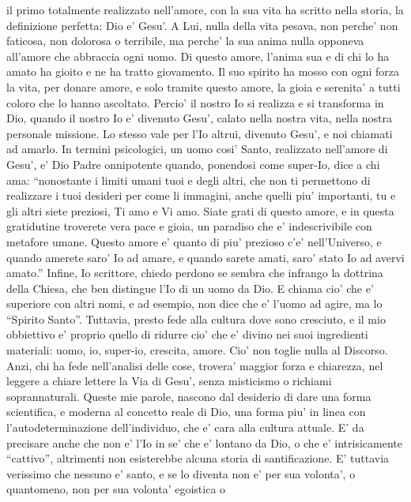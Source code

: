 il primo totalmente realizzato nell'amore,
con la sua vita ha scritto nella storia,
la definizione perfetta:
\hspace{1cm} Dio e' Gesu'.
A Lui, nulla della vita pesava,
non perche' non faticosa, non dolorosa o terribile,
ma perche' la sua anima nulla opponeva
all'amore che abbraccia ogni uomo.
Di questo amore, l'anima sua e di chi lo ha amato
ha gioito e ne ha tratto giovamento.
Il suo spirito ha mosso con ogni forza la vita,
per donare amore, e solo tramite questo amore,
la gioia e serenita' a tutti coloro
che lo hanno ascoltato.
Percio' il nostro Io si realizza e si transforma in Dio, 
quando il nostro Io e' divenuto Gesu',
calato nella nostra vita,
nella nostra personale missione.
Lo stesso vale per l'Io altrui, divenuto Gesu',
e noi chiamati ad amarlo.
\leavevmode
In termini psicologici, un uomo cosi' Santo,
realizzato nell'amore di Gesu', e' Dio Padre onnipotente
quando, ponendosi come super-Io, dice a chi ama:
``nonostante i limiti umani tuoi e degli altri,
che non ti permettono di realizzare i tuoi desideri
per come li immagini, anche quelli piu' importanti,
tu e gli altri siete preziosi,
Ti amo e Vi amo.
Siate grati di questo amore,
e in questa gratidutine
troverete vera pace e gioia,
un paradiso che e' indescrivibile con metafore umane.
Questo amore e' quanto di piu' prezioso 
c'e' nell'Universo,
e quando amerete saro' Io ad amare,
e quando sarete amati, saro' stato Io ad avervi amato.''
\leavevmode
Infine, Io scrittore, chiedo perdono 
se sembra che infrango la dottrina della Chiesa,
che ben distingue l'Io di un uomo da Dio. 
E chiama cio' che e' superiore con altri nomi, 
e ad esempio, non dice  che e' l'uomo ad agire,
ma lo ``Spirito Santo''.
Tuttavia, presto fede alla cultura dove sono cresciuto,
e il mio obbiettivo e' proprio quello di ridurre 
cio' che e' divino nei suoi ingredienti materiali: 
uomo, io, super-io, crescita, amore. 
Cio' non toglie nulla al Discorso. Anzi,
chi ha fede nell'analisi delle cose, trovera' 
maggior forza e chiarezza, nel leggere a chiare lettere
la Via di Gesu', senza misticismo o richiami soprannaturali.
Queste mie parole, nascono dal desiderio 
di dare una forma scientifica, e moderna 
al concetto reale di Dio,
una forma piu' in linea con l'autodeterminazione
dell'individuo, che e' cara alla cultura attuale.
E' da precisare anche che non e' l'Io in se'
che e' lontano da Dio, o che e' intrisicamente ``cattivo'',
altrimenti non esisterebbe alcuna storia di santificazione.
E' tuttavia verissimo che nessuno e' santo,
e se lo diventa non e' per sua volonta',
o quantomeno, non per sua volonta' egoistica o 
